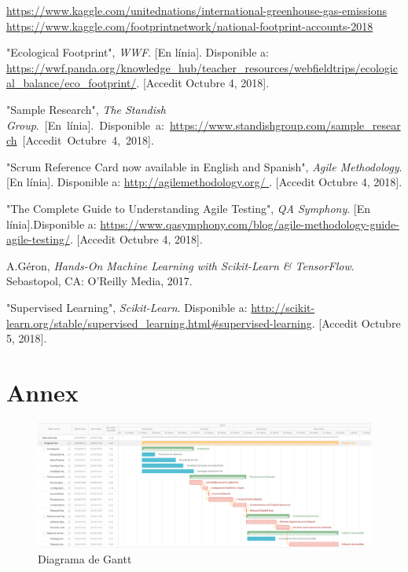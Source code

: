 \documentclass[10pt,a4paper,twocolumn,twoside]{article}
\begin{document}
\begin{thebibliography}{11}
\url{https://www.kaggle.com/unitednations/international-greenhouse-gas-emissions}
\url{https://www.kaggle.com/footprintnetwork/national-footprint-accounts-2018}

"Ecological Footprint", \textit{WWF}. [En línia]. Disponible a: \url{https://wwf.panda.org/knowledge_hub/teacher_resources/webfieldtrips/ecological_balance/eco_footprint/}. [Accedit Octubre 4, 2018].
 
"Sample Research", \textit{The Standish Group}.~[En~línia].~Disponible~a:~\url{https://www.standishgroup.com/sample_research}~[Accedit~Octubre~4,~2018].

"Scrum Reference Card now available in English and Spanish",  \textit{Agile Methodology}. [En línia]. Disponible a: \url{http://agilemethodology.org/ }. [Accedit Octubre 4, 2018].

"The Complete Guide to Understanding Agile Testing", \textit{QA Symphony}. [En línia].Disponible a: \url{https://www.qasymphony.com/blog/agile-methodology-guide-agile-testing/}. [Accedit Octubre 4, 2018].

A.Géron, \textit{Hands-On Machine Learning with Scikit-Learn \& TensorFlow}. Sebastopol, CA: O’Reilly Media, 2017.

"Supervised Learning", \textit{Scikit-Learn}. Disponible a: \url{http://scikit-learn.org/stable/supervised_learning.html#supervised-learning}. [Accedit Octubre 5, 2018].
\end{thebibliography}
\clearpage
\section{Annex}

\begin{figure}[!h]
\centering
	\includegraphics[width=1\textwidth]{img/diagrama_Gantt}

	\caption{Diagrama de Gantt}
	\label{fig-Gantt}
\end{figure}
\end{document}
